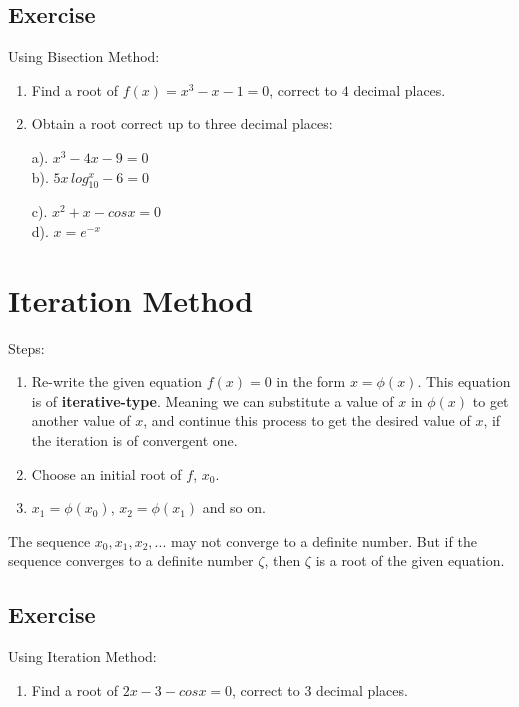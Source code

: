 \documentclass[aima203_lecturenotes_ku.tex]{subfiles}
\begin{document}
\subsection{Exercise}
Using Bisection Method:
\begin{enumerate}
\item Find a root of \(f(x)=x^3-x-1=0\), correct to \(4\) decimal places.
  \item Obtain a root correct up to three decimal places:
  \begin{multicols}{2}
    a). $x^3-4x-9=0$ \\
    b). $5x\, log_{10}^x -6 = 0$

    \columnbreak

    c). $x^2 +x -cosx = 0$ \\
    d). $x=e^{-x}$
  \end{multicols}
\end{enumerate}

\section{Iteration Method}
Steps:
\begin{enumerate}
\item Re-write the given equation \(f(x)=0\) in the form \(x= \phi (x)\).
  This equation is of \textbf{iterative-type}. Meaning we can substitute a value of \(x\) in \(\phi (x)\) to get another value of \(x\), and continue this process to get the desired value of \(x\), if the iteration is of convergent one.
\item Choose an initial root of \(f\), \(x_0\).
\item \(x_1=\phi (x_0)\), \(x_2= \phi(x_1)\) and so on.
\end{enumerate}
The sequence \(x_0, x_1, x_2, ...\) may not converge to a definite number. But if the sequence converges to a definite number \(\zeta\), then \(\zeta\) is a root of the given equation.

\subsection{Exercise}
Using Iteration Method:
\begin{enumerate}
\item Find a root of \(2x-3-cosx=0\), correct to \(3\) decimal places.
\end{enumerate}
\end{document}
